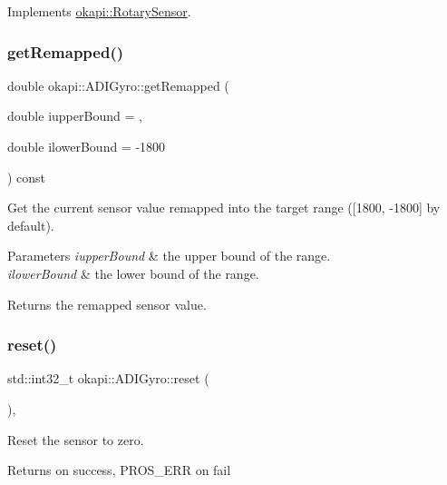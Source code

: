 Implements \mbox{\hyperlink{classokapi_1_1RotarySensor_ac5534dc6c3bcbd8ea2f4e54a04cda734}{okapi\+::\+Rotary\+Sensor}}.

\mbox{\label{classokapi_1_1ADIGyro_a5fa8fa3653e8c2eeff81a56b80e79f7c}} 
\subsubsection{\texorpdfstring{getRemapped()}{getRemapped()}}
{\footnotesize\ttfamily double okapi\+::\+A\+D\+I\+Gyro\+::get\+Remapped (\begin{DoxyParamCaption}\item[{double}]{iupper\+Bound = {},  }\item[{double}]{ilower\+Bound = {\ttfamily -\/1800} }\end{DoxyParamCaption}) const}

Get the current sensor value remapped into the target range (\mbox{[}1800, -\/1800\mbox{]} by default).


\begin{DoxyParams}{Parameters}
{\em iupper\+Bound} & the upper bound of the range. \\
\hline
{\em ilower\+Bound} & the lower bound of the range. \\
\hline
\end{DoxyParams}
\begin{DoxyReturn}{Returns}
the remapped sensor value. 
\end{DoxyReturn}
\mbox{\label{classokapi_1_1ADIGyro_a316eec0bf6008c50fea6d1a621fd2e87}} 
\subsubsection{\texorpdfstring{reset()}{reset()}}
{\footnotesize\ttfamily std\+::int32\+\_\+t okapi\+::\+A\+D\+I\+Gyro\+::reset (\begin{DoxyParamCaption}{ }\end{DoxyParamCaption})\hspace{0.3cm}{\ttfamily [override]}, {\ttfamily [virtual]}}

Reset the sensor to zero.

\begin{DoxyReturn}{Returns}
{} on success, {\ttfamily P\+R\+O\+S\+\_\+\+E\+RR} on fail 
\end{DoxyReturn}



